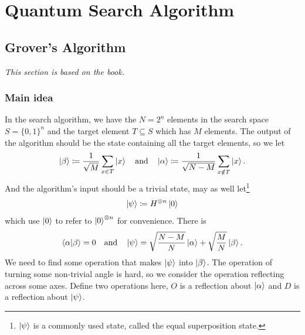 \documentclass[a4paper,10pt]{book}
\numberwithin{equation}{section}
\begin{document}
\chapter{Quantum Search Algorithm}

\section{Grover's Algorithm}

\textit{This section is based on the book\cite{nielsen2010}.}

\subsection{\label{subsec:GroverMainIdea}Main idea}

In the search algorithm, we have the $N=2^{n}$ elements in the search space $S=\{0,1\}^{n}$ and the target element $T\subseteq S$ which has $M$ elements. The output of the algorithm should be the state containing all the target elements, so we let
\begin{equation}
    \ket{\beta}\coloneqq\frac{1}{\sqrt{M}}\sum_{x\in T}\ket{x}
    \quad\text{and}\quad
    \ket{\alpha}\coloneqq\frac{1}{\sqrt{N-M}}\sum_{x\notin T}\ket{x}.
\end{equation}
And the algorithm's input should be a trivial state, may as well let\footnote{$\ket{\psi}$ is a commonly used state, called the equal superposition state.}
\begin{equation}
    \ket{\psi}\coloneqq H^{\otimes n}\ket{0}
\end{equation}
which use $\ket{0}$ to refer to $\ket{0}^{\otimes n}$ for convenience. There is
\begin{equation}
    \braket{\alpha|\beta}=0
    \quad\text{and}\quad
    \ket{\psi}=\sqrt{\frac{N-M}{N}}\ket{\alpha}+\sqrt{\frac{M}{N}}\ket{\beta}.
\end{equation}
We need to find some operation that makes $\ket{\psi}$ into $\ket{\beta}$. The operation of turning some non-trivial angle is hard, so we consider the operation reflecting across some axes. Define two operations here, $O$ is a reflection about $\ket{\alpha}$ and $D$ is a reflection about $\ket{\psi}$.
\end{document}
